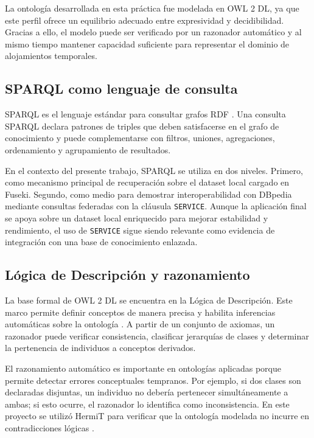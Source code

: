 La ontología desarrollada en esta práctica fue modelada en OWL 2 DL, ya que este
perfil ofrece un equilibrio adecuado entre expresividad y decidibilidad. Gracias a ello,
el modelo puede ser verificado por un razonador automático y al mismo tiempo mantener
capacidad suficiente para representar el dominio de alojamientos temporales.

\subsection{SPARQL como lenguaje de consulta}

SPARQL es el lenguaje estándar para consultar grafos RDF \parencite{w3c-sparql2013}.
Una consulta SPARQL declara patrones de triples que deben satisfacerse en el grafo de
conocimiento y puede complementarse con filtros, uniones, agregaciones, ordenamiento y
agrupamiento de resultados.

En el contexto del presente trabajo, SPARQL se utiliza en dos niveles. Primero, como
mecanismo principal de recuperación sobre el dataset local cargado en Fuseki. Segundo,
como medio para demostrar interoperabilidad con DBpedia mediante consultas federadas con
la cláusula \texttt{SERVICE}. Aunque la aplicación final se apoya sobre un dataset local
enriquecido para mejorar estabilidad y rendimiento, el uso de \texttt{SERVICE} sigue
siendo relevante como evidencia de integración con una base de conocimiento enlazada.

\subsection{Lógica de Descripción y razonamiento}

La base formal de OWL 2 DL se encuentra en la Lógica de Descripción. Este marco permite
definir conceptos de manera precisa y habilita inferencias automáticas sobre la
ontología \parencite{baader2003}. A partir de un conjunto de axiomas, un razonador
puede verificar consistencia, clasificar jerarquías de clases y determinar la
pertenencia de individuos a conceptos derivados.

El razonamiento automático es importante en ontologías aplicadas porque permite detectar
errores conceptuales tempranos. Por ejemplo, si dos clases son declaradas disjuntas, un
individuo no debería pertenecer simultáneamente a ambas; si esto ocurre, el razonador lo
identifica como inconsistencia. En este proyecto se utilizó HermiT para verificar que la
ontología modelada no incurre en contradicciones lógicas \parencite{glimm2014}.

